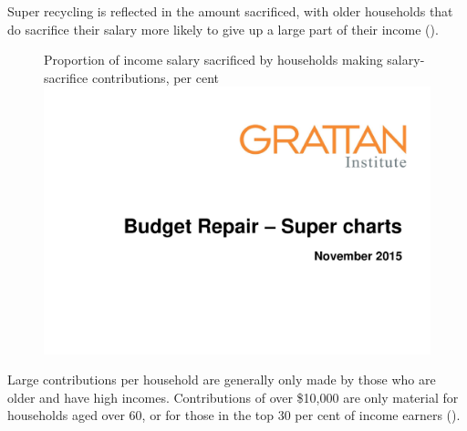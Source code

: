 \begin{subappendices}
Super recycling is reflected in the amount sacrificed, with older households that do sacrifice their salary more likely to give up a large part of their income (). 

\begin{figure}
%
{Proportion of income salary sacrificed by households making salary-sacrifice contributions, per cent}
\includegraphics[width=\columnwidth,page=40]{super-atlas/PPTX.pdf}

\end{figure}

Large contributions per household are generally only made by those who are older and have high incomes. Contributions of over 
\$10,000 are only material for households aged over 60, or for those in the top 30 per cent of income earners (). 


\end{subappendices}
